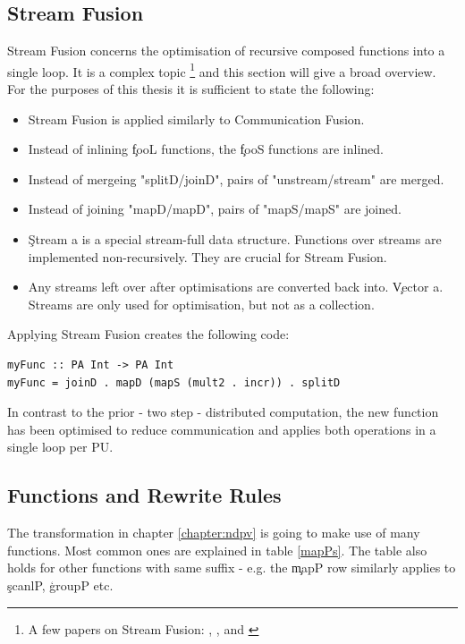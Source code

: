  \subsection{Stream Fusion}
    Stream Fusion concerns the optimisation of recursive composed functions
    into a single loop. It is a complex topic
    \footnote{A few papers on Stream Fusion:
    \cite{GenVectorFusion2013}, \cite{Fusion2007},
    \cite{ArrayFusion2001Chakravarty}
    and \cite{CostArray2002Leshchinskiy}
    } and this section will give a broad overview.
    For the purposes of this thesis it is sufficient to state the following:
    \begin{itemize}
      \item Stream Fusion is applied similarly to Communication Fusion.
      \item Instead of inlining \c{fooL} functions, the \c{fooS} functions are inlined.
      \item Instead of mergeing "splitD/joinD", pairs of "unstream/stream" are merged.
      \item Instead of joining "mapD/mapD", pairs of "mapS/mapS" are joined.
      \item \c{Stream a} is a special stream-full data structure.
        Functions over streams are implemented non-recursively.
        They are crucial for Stream Fusion.
      \item Any streams left over after optimisations are converted back into.
        \c{Vector a}. Streams are only used for optimisation, but not as a collection.
    \end{itemize}
    Applying Stream Fusion creates the following code:
    \begin{lstlisting}
myFunc :: PA Int -> PA Int
myFunc = joinD . mapD (mapS (mult2 . incr)) . splitD
    \end{lstlisting}
    In contrast to the prior - two step - distributed computation,
    the new function has been optimised to reduce communication
    and applies both operations in a single loop per PU.
    
  \subsection*{Functions and Rewrite Rules}
    The transformation in chapter \ref{chapter:ndpv} is going to
    make use of many functions. Most common ones are explained in table \ref{mapPs}.
    The table also holds for other functions with same suffix - e.g.
    the \c{mapP} row similarly applies to \c{scanlP}, \c{groupP} etc.
    
